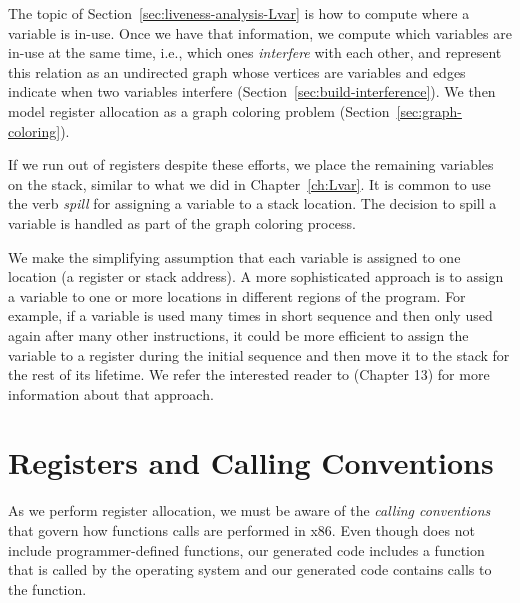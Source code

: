 \documentclass[7x10,nocrop]{TimesAPriori_MIT}%
\begin{document}
The topic of Section~\ref{sec:liveness-analysis-Lvar} is how to
compute where a variable is in-use.  Once we have that information, we
compute which variables are in-use at the same time, i.e., which ones
\emph{interfere} with each other, and
represent this relation as an undirected graph whose vertices are
variables and edges indicate when two variables interfere
(Section~\ref{sec:build-interference}). We then model register
allocation as a graph coloring problem
(Section~\ref{sec:graph-coloring}).

If we run out of registers despite these efforts, we place the
remaining variables on the stack, similar to what we did in
Chapter~\ref{ch:Lvar}. It is common to use the verb
\emph{spill} for assigning a variable to a stack
location. The decision to spill a variable is handled as part of the
graph coloring process.

We make the simplifying assumption that each variable is assigned to
one location (a register or stack address). A more sophisticated
approach is to assign a variable to one or more locations in different
regions of the program.  For example, if a variable is used many times
in short sequence and then only used again after many other
instructions, it could be more efficient to assign the variable to a
register during the initial sequence and then move it to the stack for
the rest of its lifetime. We refer the interested reader to
\citet{Cooper:2011aa} (Chapter 13) for more information about that
approach.


\section{Registers and Calling Conventions}
\label{sec:calling-conventions}

As we perform register allocation, we must be aware of the
\emph{calling conventions}  that
govern how functions calls are performed in x86.
%
Even though \LangVar{} does not include programmer-defined functions,
our generated code includes a  function that is called by
the operating system and our generated code contains calls to the
 function.
\end{document}
